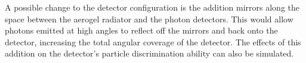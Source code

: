 A possible change to the detector configuration is the addition mirrors along the space between the aerogel radiator and the photon detectors.
This would allow photons emitted at high angles to reflect off the mirrors and back onto the detector, increasing the total angular coverage of the detector. 
The effects of this addition on the detector's particle discrimination ability can also be simulated.




\endinput

Any text after an \endinput is ignored.
You could put scraps here or things in progress.
